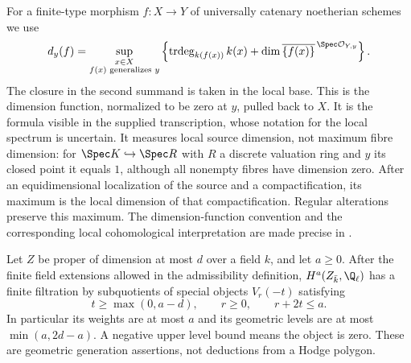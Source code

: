 \begin{definition}
\label{c:local-dimension}
For a finite-type morphism $f:X\to Y$ of universally catenary noetherian schemes we use
\[
 d_y(f)=\sup_{\substack{x\in X\\ f(x)\text{ generalizes }y}}
 \left\{\operatorname{trdeg}_{k(f(x))}k(x)
       +\dim\overline{\{f(x)\}}^{\,\Spec\mathcal O_{Y,y}}\right\}.
\]
The closure in the second summand is taken in the local base. This is the dimension function, normalized to be zero at $y$, pulled back to $X$. It is the formula visible in the supplied transcription, whose notation for the local spectrum is uncertain. It measures local source dimension, not maximum fibre dimension: for $\Spec K\hookrightarrow\Spec R$ with $R$ a discrete valuation ring and $y$ its closed point it equals $1$, although all nonempty fibres have dimension zero. After an equidimensional localization of the source and a compactification, its maximum is the local dimension of that compactification. Regular alterations preserve this maximum. The dimension-function convention and the corresponding local cohomological interpretation are made precise in \citet[\S1.1.1 and Corollary 1.2.2]{c_pillonistroh2014}.
\end{definition}

\begin{lemma}
\label{c:proper-level}
Let $Z$ be proper of dimension at most $d$ over a field $k$, and let $a\geq0$. After the finite field extensions allowed in the admissibility definition, $H^a(Z_{\bar k},\Q_\ell)$ has a finite filtration by subquotients of special objects $V_r(-t)$ satisfying
\[
 t\geq\max(0,a-d),\qquad r\geq0,\qquad r+2t\leq a.
\]
In particular its weights are at most $a$ and its geometric levels are at most $\min(a,2d-a)$. A negative upper level bound means the object is zero. These are geometric generation assertions, not deductions from a Hodge polygon.
\end{lemma}

